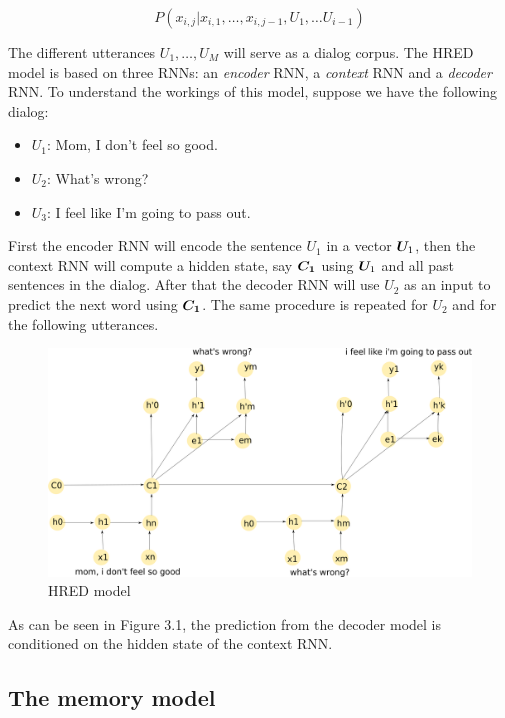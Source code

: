 \begin{equation}
P(x_{i,j} | x_{i,1}, \dots , x_{i,j-1}, U_{1}, \dots U_{i-1})
\end{equation}

The different utterances $ U_1 , \dots, U_M $ will serve as a dialog corpus.
The HRED model is based on three RNNs: an \textit{encoder} RNN, a \textit{context} RNN and a \textit{decoder} RNN.  To understand the workings of this model, suppose we have the following dialog:
\begin{itemize}
\item $U_1$: Mom, I don't feel so good.\\
\item $U_2$: What's wrong?\\
\item $U_3$: I feel like I'm going to pass out.
\end{itemize}

First the encoder RNN will encode the sentence $U_1$ in a vector $\bm{U}_1$, then the context RNN will compute a hidden state, say $\bm{C_1}$ using $\bm{U}_1$ and all past sentences in the dialog. After that the decoder RNN will use $U_2$ as an input to predict the next word using $\bm{C_1}$. The same procedure is repeated for $U_2$ and for the following utterances.

\begin{figure}[h]
\label{HRED}
\includegraphics[width=12cm]{img/HRED_placeholder.png}
\caption{HRED model}
\end{figure}

As can be seen in Figure 3.1, the prediction from the decoder model is conditioned on the hidden state of the context RNN.

\subsection{The memory model} 

